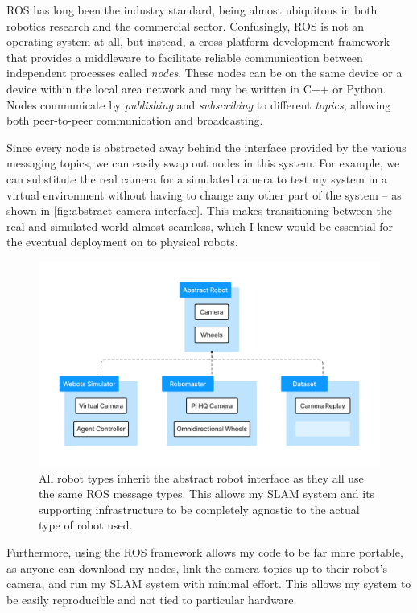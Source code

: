 ROS has long been the industry standard, being almost ubiquitous in both robotics research and the commercial sector. Confusingly, ROS is not an operating system at all, but instead, a cross-platform development framework that provides a middleware to facilitate reliable communication between independent processes called \textit{nodes}. These nodes can be on the same device or a device within the local area network and may be written in C++ or Python. Nodes communicate by \textit{publishing} and \textit{subscribing} to different \textit{topics}, allowing both peer-to-peer communication and broadcasting.

Since every node is abstracted away behind the interface provided by the various messaging topics, we can easily swap out nodes in this system. For example, we can substitute the real camera for a simulated camera to test my system in a virtual environment without having to change any other part of the system – as shown in \autoref{fig:abstract-camera-interface}. This makes transitioning between the real and simulated world almost seamless, which I knew would be essential for the eventual deployment on to physical robots.

\begin{figure}[h]
    \centering
    \includegraphics[trim=5cm 5cm 5cm 5cm, scale=0.15]{figures/abstract_camera_interface.pdf}

    \caption{All robot types inherit the abstract robot interface as they all use the same ROS message types. This allows my SLAM system and its supporting infrastructure to be completely agnostic to the actual type of robot used.}
    \label{fig:abstract-camera-interface}
\end{figure}

Furthermore, using the ROS framework allows my code to be far more portable, as anyone can download my nodes, link the camera topics up to their robot's camera, and run my SLAM system with minimal effort. This allows my system to be easily reproducible and not tied to particular hardware.

